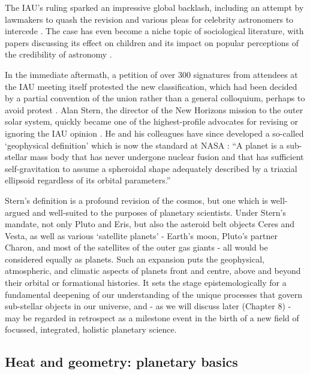 \documentclass[a4paper,11pt,oneside]{book}
\begin{document}
The IAU's ruling sparked an impressive global backlash, including an attempt by lawmakers to quash the revision \cite{Zielinski2007-fv} and various pleas for celebrity astronomers to intercede \cite{Tyson2009-oe}. The case has even become a niche topic of sociological literature, with papers discussing its effect on children \citet{Jarman2009-ms, Broughton2013-wz} and its impact on popular perceptions of the credibility of astronomy \citet{Christensen2007-xw, Messeri2010-wo}.

In the immediate aftermath, a petition of over 300 signatures from attendees at the IAU meeting itself protested the new classification, which had been decided by a partial convention of the union rather than a general colloquium, perhaps to avoid protest \cite{Cartlidge2006-oe}. Alan Stern, the director of the New Horizons mission to the outer solar system, quickly became one of the highest-profile advocates for revising or ignoring the IAU opinion \cite{Hogan2006-aw}. He and his colleagues have since developed a so-called `geophysical definition' which is now the standard at NASA \cite{Runyon2017-rz}: ``A planet is a sub-stellar mass body that has never undergone nuclear fusion and that has sufficient self-gravitation to assume a spheroidal shape adequately described by a triaxial ellipsoid regardless of its orbital parameters.''

Stern's definition is a profound revision of the cosmos, but one which is well-argued and well-suited to the purposes of planetary scientists. Under Stern's mandate, not only Pluto and Eris, but also the asteroid belt objects Ceres and Vesta, as well as various `satellite planets' - Earth's moon, Pluto's partner Charon, and most of the satellites of the outer gas giants - all would be considered equally as planets. Such an expansion puts the geophysical, atmospheric, and climatic aspects of planets front and centre, above and beyond their orbital or formational histories. It sets the stage epistemologically for a fundamental deepening of our understanding of the unique processes that govern sub-stellar objects in our universe, and - as we will discuss later (Chapter 8) - may be regarded in retrospect as a milestone event in the birth of a new field of focussed, integrated, holistic planetary science.

\subsection{Heat and geometry: planetary basics}
\end{document}
